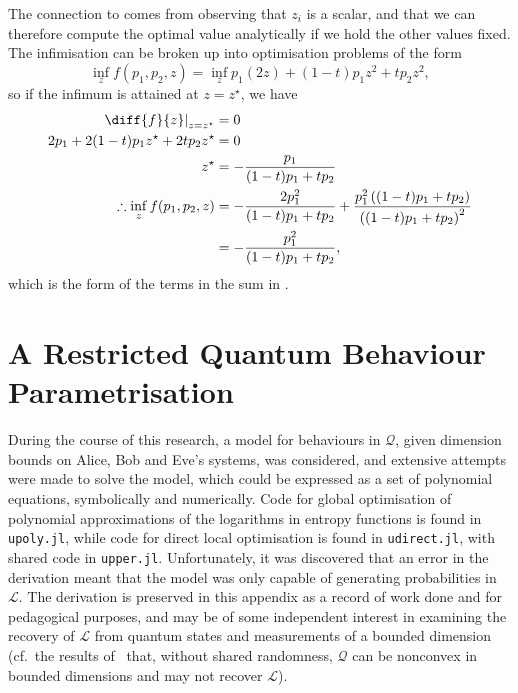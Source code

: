 \documentclass[10pt, a4paper]{article}
\numberwithin{equation}{section} %
\theoremstyle{definition}
\theoremstyle{plain}
\newcommand{\?}{\mathrel{?}} %
\newcommand{\Ls}{\mathcal{L}}
\newcommand{\Qs}{\mathcal{Q}}
\begin{document}
\begin{appendices}
                    The connection to  comes from observing that \(z_i\) is a scalar, and that we can therefore compute the optimal value analytically if we hold the other values fixed. The infimisation can be broken up into optimisation problems of the form
                    \begin{equation}
                      \inf_z f(p_1, p_2, z) = \inf_z p_1(2z) + (1-t) p_1 z^2 + t p_2 z^2,
                    \end{equation}
                    so if the infimum is attained at \(z=z^{\star}\), we have
                    \begin{align}
                      \left. \diff{f}{z} \right|_{z=z^{\star}} &= 0 \\
                        2p_1 + 2(1-t) p_1 z^{\star} + 2t p_2 z^{\star} &= 0 \\
                        z^{\star} &= -\frac{p_1}{(1-t)p_1 + tp_2} \\
                        \therefore \inf_z f(p_1, p_2, z) &= -\frac{2p_1^2}{(1-t)p_1 + tp_2} + \frac{p_1^2 \left( (1-t)p_1 + tp_2 \right)}{{\left((1-t)p_1 + tp_2\right)}^2} \\
                                                         &= -\frac{p_1^2}{(1-t)p_1 + tp_2},
                      \end{align}
                      which is the form of the terms in the sum in .

                      \section{A Restricted Quantum Behaviour Parametrisation}\label{sec:wrongparam}

                      During the course of this research, a model for behaviours in \(\Qs\), given dimension bounds on Alice, Bob and Eve's systems, was considered, and extensive attempts were made to solve the model, which could be expressed as a set of polynomial equations, symbolically and numerically. Code for global optimisation of polynomial approximations of the logarithms in entropy functions is found in \verb`upoly.jl`, while code for direct local optimisation is found in \verb`udirect.jl`, with shared code in \verb`upper.jl`. Unfortunately, it was discovered that an error in the derivation meant that the model was only capable of generating probabilities in \(\Ls\). The derivation is preserved in this appendix as a record of work done and for pedagogical purposes, and may be of some independent interest in examining the recovery of \(\Ls\) from quantum states and measurements of a bounded dimension (cf.\ the results of~\cite{FiniteDimNonconvex} that, without shared randomness, \(\Qs\) can be nonconvex in bounded dimensions and may not recover \(\Ls\)).


\end{appendices}
\end{document}
